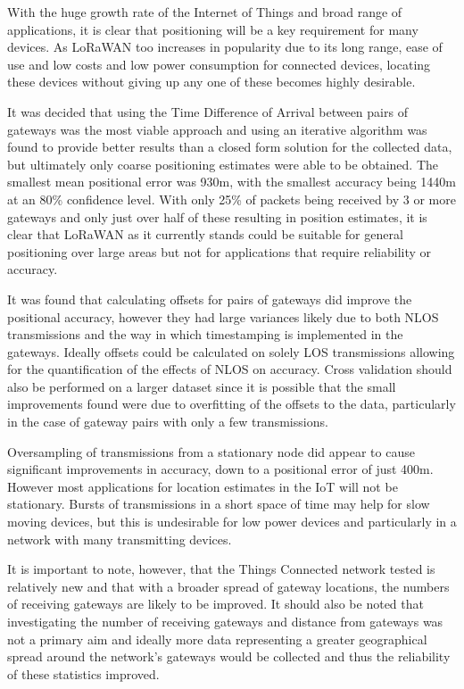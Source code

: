 \documentclass[a4paper]{report}
\begin{document}
  With the huge growth rate of the Internet of Things and broad range of applications, it is clear that positioning will be a key requirement for many devices. As LoRaWAN too increases in popularity due to its long range, ease of use and low costs and low power consumption for connected devices, locating these devices without giving up any one of these becomes highly desirable.

  It was decided that using the Time Difference of Arrival between pairs of gateways was the most viable approach and using an iterative algorithm was found to provide better results than a closed form solution for the collected data, but ultimately only coarse positioning estimates were able to be obtained. The smallest mean positional error was 930m, with the smallest accuracy being 1440m at an 80\% confidence level. With only 25\% of packets being received by 3 or more gateways and only just over half of these resulting in position estimates, it is clear that LoRaWAN as it currently stands could be suitable for general positioning over large areas but not for applications that require reliability or accuracy.

  It was found that calculating offsets for pairs of gateways did improve the positional accuracy, however they had large variances likely due to both NLOS transmissions and the way in which timestamping is implemented in the gateways. Ideally offsets could be calculated on solely LOS transmissions allowing for the quantification of the effects of NLOS on accuracy. Cross validation should also be performed on a larger dataset since it is possible that the small improvements found were due to overfitting of the offsets to the data, particularly in the case of gateway pairs with only a few transmissions.

  Oversampling of transmissions from a stationary node did appear to cause significant improvements in accuracy, down to a positional error of just 400m. However most applications for location estimates in the IoT will not be stationary. Bursts of transmissions in a short space of time may help for slow moving devices, but this is undesirable for low power devices and particularly in a network with many transmitting devices.

  It is important to note, however, that the Things Connected network tested is relatively new and that with a broader spread of gateway locations, the numbers of receiving gateways are likely to be improved. It should also be noted that investigating the number of receiving gateways and distance from gateways was not a primary aim and ideally more data representing a greater geographical spread around the network's gateways would be collected and thus the reliability of these statistics improved.
\end{document}

